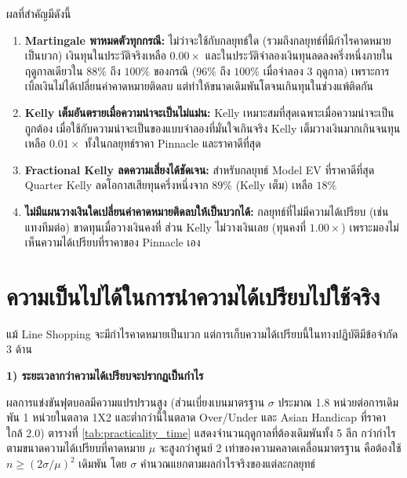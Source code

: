 ผลที่สำคัญมีดังนี้
\begin{enumerate}[label=\arabic*)]
    \item \textbf{Martingale พาหมดตัวทุกกรณี:} ไม่ว่าจะใช้กับกลยุทธ์ใด (รวมถึงกลยุทธ์ที่มีกำไรคาดหมายเป็นบวก) เงินทุนในประวัติจริงเหลือ $0.00\times$ และในประวัติจำลองเงินทุนลดลงครึ่งหนึ่งภายในฤดูกาลเดียวใน $88\%$ ถึง $100\%$ ของกรณี ($96\%$ ถึง $100\%$ เมื่อจำลอง 3 ฤดูกาล) เพราะการเบิ้ลเงินไม่ได้เปลี่ยนค่าคาดหมายติดลบ แต่ทำให้ขนาดเดิมพันโตจนเกินทุนในช่วงแพ้ติดกัน
    \item \textbf{Kelly เต็มอันตรายเมื่อความน่าจะเป็นไม่แม่น:} Kelly เหมาะสมที่สุดเฉพาะเมื่อความน่าจะเป็นถูกต้อง เมื่อใช้กับความน่าจะเป็นของแบบจำลองที่มั่นใจเกินจริง Kelly เต็มวางเงินมากเกินจนทุนเหลือ $0.01\times$ ทั้งในกลยุทธ์ราคา Pinnacle และราคาดีที่สุด
    \item \textbf{Fractional Kelly ลดความเสี่ยงได้ชัดเจน:} สำหรับกลยุทธ์ Model EV ที่ราคาดีที่สุด Quarter Kelly ลดโอกาสเสียทุนครึ่งหนึ่งจาก $89\%$ (Kelly เต็ม) เหลือ $18\%$
    \item \textbf{ไม่มีแผนวางเงินใดเปลี่ยนค่าคาดหมายติดลบให้เป็นบวกได้:} กลยุทธ์ที่ไม่มีความได้เปรียบ (เช่น แทงทีมต่อ) ขาดทุนเมื่อวางเงินคงที่ ส่วน Kelly ไม่วางเงินเลย (ทุนคงที่ $1.00\times$) เพราะมองไม่เห็นความได้เปรียบที่ราคาของ Pinnacle เอง
\end{enumerate}

\section{ความเป็นไปได้ในการนำความได้เปรียบไปใช้จริง}

แม้ Line Shopping จะมีกำไรคาดหมายเป็นบวก แต่การเก็บความได้เปรียบนี้ในทางปฏิบัติมีข้อจำกัด 3 ด้าน

\par\noindent\textbf{1) ระยะเวลากว่าความได้เปรียบจะปรากฏเป็นกำไร}\par\nopagebreak[4]
ผลการแข่งขันฟุตบอลมีความแปรปรวนสูง (ส่วนเบี่ยงเบนมาตรฐาน $\sigma$ ประมาณ 1.8 หน่วยต่อการเดิมพัน 1 หน่วยในตลาด 1X2 และต่ำกว่านี้ในตลาด Over/Under และ Asian Handicap ที่ราคาใกล้ 2.0) ตารางที่ \ref{tab:practicality_time} แสดงจำนวนฤดูกาลที่ต้องเดิมพันทั้ง 5 ลีก กว่ากำไรตามขนาดความได้เปรียบที่คาดหมาย $\mu$ จะสูงกว่าศูนย์ 2 เท่าของความคลาดเคลื่อนมาตรฐาน คือต้องใช้ $n \ge (2\sigma/\mu)^2$ เดิมพัน โดย $\sigma$ คำนวณแยกตามผลกำไรจริงของแต่ละกลยุทธ์

